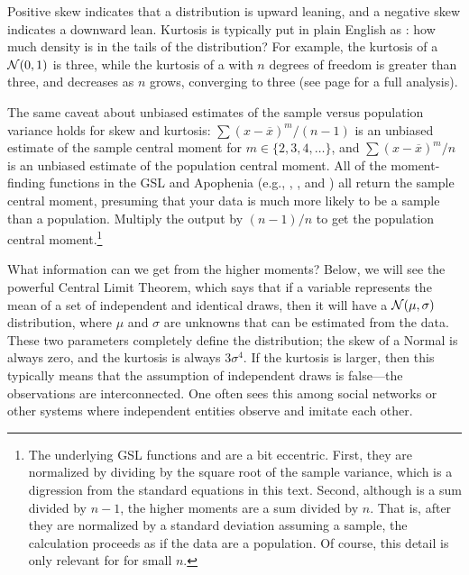 Positive skew indicates that a distribution is upward leaning, and a negative
skew indicates a downward lean. Kurtosis is typically put in plain
English as : how much density is in the tails of the
distribution? For example, the kurtosis of a ${\cal N}(0,1)$ is three,
while the kurtosis of a  with $n$ degrees of
freedom is greater than three, and decreases as $n$ grows, converging to
three (see page \pageref{tkurt} for a full analysis).

 
 
\label{kurtskew}
The same caveat about unbiased estimates of the sample versus population
variance holds for skew and kurtosis: $\sum (x-\overline x)^m/(n-1)$
is an unbiased estimate of the sample central moment for $m \in\{2, 3,
4, \dots\}$, and $\sum (x-\overline x)^m/n$ is an unbiased estimate of
the population central moment. All of the moment-finding functions in
the GSL and Apophenia (e.g.,
,
, and
) all return the sample central
moment, presuming that your data is much more likely to be a sample than
a population. Multiply the output by $(n-1)/n$ to get the population
central moment.\footnote{The underlying GSL functions 
 and  are a bit
eccentric.   
First, they are 
normalized by dividing by the square root of the sample variance, which
is a digression from the standard equations in this text. Second, although
 is a sum divided by $n-1$, the higher moments
are a sum divided by $n$. That is, after they are normalized by a standard
deviation assuming a sample, the calculation proceeds as if the data are a
population. Of course, this detail is only relevant for for small $n$.}


What information can we get from the higher moments?  Below, we will
see the powerful Central Limit Theorem, which says that if a variable
represents the mean of a set of independent and identical draws, then it
will have a ${\cal N}(\mu,\sigma)$ distribution, where $\mu$ and $\sigma$
are unknowns that can be estimated from the data. These two parameters
completely define the distribution; the skew of a Normal is always zero,
and the kurtosis is always $3\sigma^4$. If the kurtosis is larger,
then this typically means that the assumption of independent draws is
false---the observations are interconnected.\label{kurt1} One often sees
this among social networks or other systems where independent entities
observe and imitate each other.

